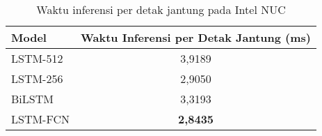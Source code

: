 \begin{table}[H]
\centering
\caption{Waktu inferensi per detak jantung pada Intel NUC}
\label{tab:waktu-inferensi-per-beat-intelnuc}
\begin{tabularx}{0.8\textwidth}{
  |>{\centering\arraybackslash}X
  |c
|}
\hline
\textbf{Model} & \textbf{Waktu Inferensi per Detak Jantung (ms)} \\ \hline
LSTM-512       & 3,9189                   \\
\hline
LSTM-256       & 2,9050                   \\
\hline
BiLSTM         & 3,3193                   \\
\hline
LSTM-FCN       & \textbf{2,8435}                   \\ \hline
\end{tabularx}
\end{table}


%
%


